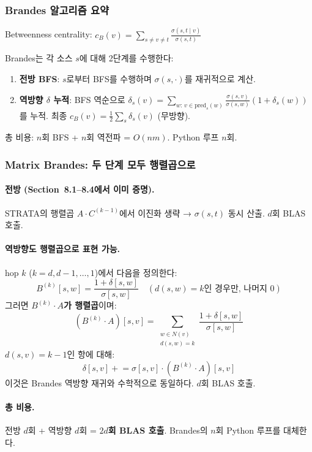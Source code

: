 \documentclass[11pt,a4paper]{article}
\begin{document}
\subsubsection{Brandes 알고리즘 요약}

Betweenness centrality: $c_B(v) = \sum_{s \neq v \neq t} \frac{\sigma(s,t \mid v)}{\sigma(s,t)}$

Brandes는 각 소스 $s$에 대해 2단계를 수행한다:
\begin{enumerate}
\item \textbf{전방 BFS}: $s$로부터 BFS를 수행하며 $\sigma(s, \cdot)$를 재귀적으로 계산.
\item \textbf{역방향 $\delta$ 누적}: BFS 역순으로 $\delta_s(v) = \sum_{w:\,v \in \mathrm{pred}_s(w)} \frac{\sigma(s,v)}{\sigma(s,w)} (1 + \delta_s(w))$ 를 누적. 최종 $c_B(v) = \frac{1}{2}\sum_s \delta_s(v)$ (무방향).
\end{enumerate}
총 비용: $n$회 BFS + $n$회 역전파 = $O(nm)$. Python 루프 $n$회.


\subsubsection{Matrix Brandes: 두 단계 모두 행렬곱으로}

\paragraph{전방 (Section~8.1--8.4에서 이미 증명).}
STRATA의 행렬곱 $A \cdot C^{(k-1)}$에서 이진화 생략 → $\sigma(s,t)$ 동시 산출. $d$회 BLAS 호출.

\paragraph{역방향도 행렬곱으로 표현 가능.}
hop $k$ ($k = d, d{-}1, \ldots, 1$)에서 다음을 정의한다:
\[
B^{(k)}[s,w] = \frac{1 + \delta[s,w]}{\sigma[s,w]} \quad (d(s,w) = k \text{인 경우만, 나머지 0})
\]
그러면 \textbf{$B^{(k)} \cdot A$가 행렬곱}이며:
\[
(B^{(k)} \cdot A)[s,v] = \sum_{\substack{w \in N(v) \\ d(s,w)=k}} \frac{1+\delta[s,w]}{\sigma[s,w]}
\]
$d(s,v) = k{-}1$인 항에 대해:
\[
\delta[s,v] \mathrel{+}= \sigma[s,v] \cdot (B^{(k)} \cdot A)[s,v]
\]
이것은 Brandes 역방향 재귀와 수학적으로 동일하다. $d$회 BLAS 호출.

\paragraph{총 비용.} 전방 $d$회 + 역방향 $d$회 = \textbf{$2d$회 BLAS 호출}. Brandes의 $n$회 Python 루프를 대체한다.
\end{document}
